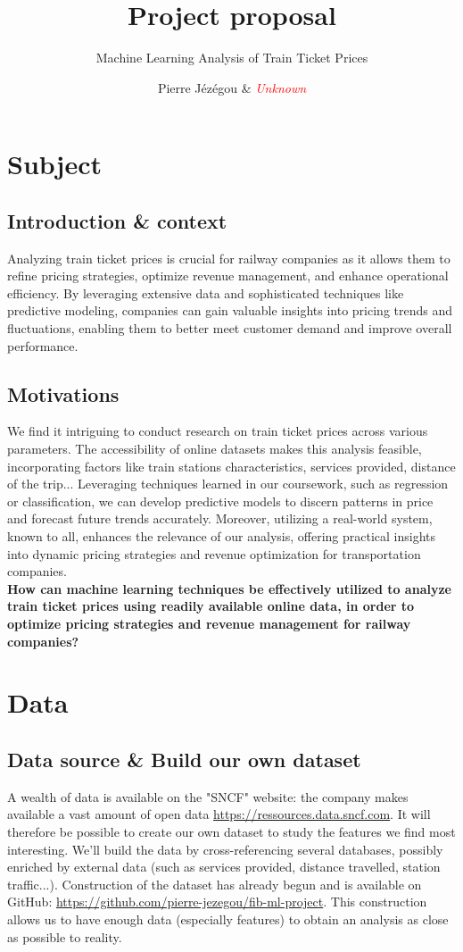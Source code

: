 \documentclass[10pt,a4paper,hidelinks]{article}
\title{Project proposal}
\subtitle{Machine Learning Analysis of Train Ticket Prices}
\date{}
\author{Pierre Jézégou \& \textcolor{red}{\textit{Unknown}}}
\begin{document}
\maketitle

\section{Subject}
\subsection{Introduction \& context}
Analyzing train ticket prices is crucial for railway companies as it allows them to refine pricing strategies, optimize revenue management, and enhance operational efficiency. By leveraging extensive data and sophisticated techniques like predictive modeling, companies can gain valuable insights into pricing trends and fluctuations, enabling them to better meet customer demand and improve overall performance.

\subsection{Motivations}
We find it intriguing to conduct research on train ticket prices across various parameters. The accessibility of online datasets makes this analysis feasible, incorporating factors like train stations characteristics, services provided, distance of the trip... Leveraging techniques learned in our coursework, such as regression or classification, we can develop predictive models to discern patterns in price and forecast future trends accurately. Moreover, utilizing a real-world system, known to all, enhances the relevance of our analysis, offering practical insights into dynamic pricing strategies and revenue optimization for transportation companies.\\

\textbf{How can machine learning techniques be effectively utilized to analyze train ticket prices using readily available online data, in order to optimize pricing strategies and revenue management for railway companies?}

\section{Data}
\subsection{Data source \& Build our own dataset}
A wealth of data is available on the "SNCF" website: the company makes available a vast amount of open data \url{https://ressources.data.sncf.com}. It will therefore be possible to create our own dataset to study the features we find most interesting. We'll build the data by cross-referencing several databases, possibly enriched by external data (such as services provided, distance travelled, station traffic...). 
Construction of the dataset has already begun and is available on GitHub: \url{https://github.com/pierre-jezegou/fib-ml-project}.  This construction allows us to have enough data (especially features) to obtain an analysis as close as possible to reality.
\end{document}
